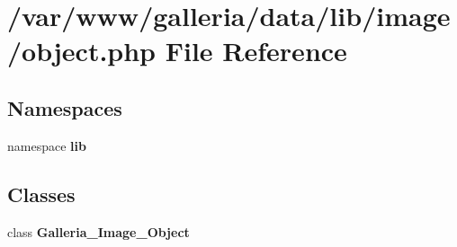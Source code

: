 \section{/var/www/galleria/data/lib/image/object.php File Reference}
\label{image_2object_8php}
\subsection*{Namespaces}
\begin{CompactItemize}
\item 
namespace {\bf lib}
\end{CompactItemize}
\subsection*{Classes}
\begin{CompactItemize}
\item 
class {\bf Galleria\_\-Image\_\-Object}
\end{CompactItemize}
